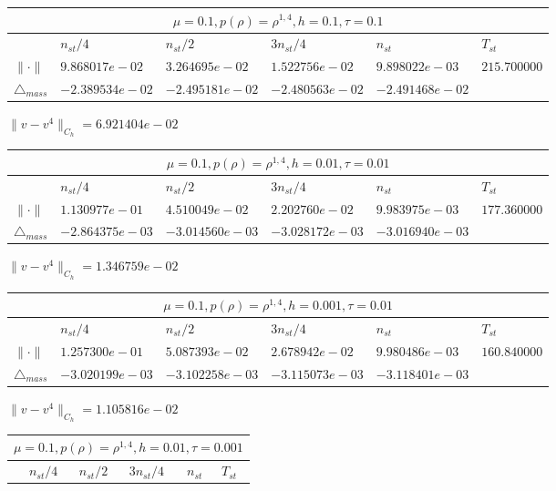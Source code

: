 \begin{tabular}{*{6}{|l}|}
    \hline
     \\
    \hline
    &$n_{st}/4 $&$ n_{st}/2$&$3n_{st}/4$&$n_{st}$&$T_{st}$ \\
    \hline
    $\|\cdot \|$& $9.868017e-02$ & $3.264695e-02$ & $1.522756e-02$ & $9.898022e-03$ &$215.700000$\\
\hline
$\triangle_{mass}$& $-2.389534e-02$ & $-2.495181e-02$ & $-2.480563e-02$ & $-2.491468e-02$ &\\
\hline
\end{tabular}

$\|v-v^{4}\|_{C_h} = 6.921404e-02$


\begin{tabular}{*{6}{|l}|}
    \hline
     \\
    \hline
    &$n_{st}/4 $&$ n_{st}/2$&$3n_{st}/4$&$n_{st}$&$T_{st}$ \\
    \hline
$\|\cdot \|$& $1.130977e-01$ & $4.510049e-02$ & $2.202760e-02$ & $9.983975e-03$ &$177.360000$\\
\hline
$\triangle_{mass}$& $-2.864375e-03$ & $-3.014560e-03$ & $-3.028172e-03$ & $-3.016940e-03$ &\\
\hline
\end{tabular}

$\|v-v^{4}\|_{C_h} = 1.346759e-02$


\begin{tabular}{*{6}{|l}|}
    \hline
     \\
    \hline
    &$n_{st}/4 $&$ n_{st}/2$&$3n_{st}/4$&$n_{st}$&$T_{st}$ \\
    \hline
    $\|\cdot \|$& $1.257300e-01$ & $5.087393e-02$ & $2.678942e-02$ & $9.980486e-03$ &$160.840000$\\
\hline
$\triangle_{mass}$& $-3.020199e-03$ & $-3.102258e-03$ & $-3.115073e-03$ & $-3.118401e-03$ &\\
\hline
\end{tabular}

$\|v-v^{4}\|_{C_h} = 1.105816e-02$

\begin{tabular}{*{6}{|l}|}
    \hline
     \\
    \hline
    &$n_{st}/4 $&$ n_{st}/2$&$3n_{st}/4$&$n_{st}$&$T_{st}$ \\
    \hline
\end{tabular}

